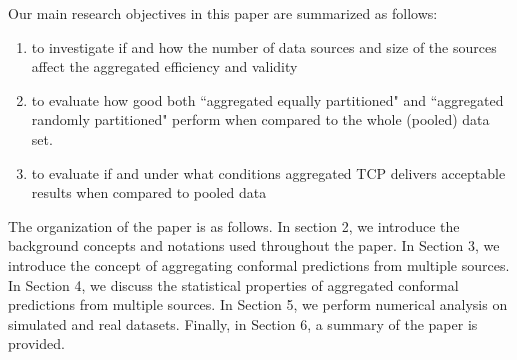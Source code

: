 \documentclass[main]{subfiles}
\newcommand{\todo}[1]{{\color{blue} #1 }}
\begin{document}

Our main research objectives in this paper are summarized as follows:

\begin{enumerate}
\item to investigate if and how the number of data sources and size of the sources affect the aggregated efficiency and validity

\item to evaluate how good both ``aggregated equally partitioned" and ``aggregated randomly partitioned" perform when compared to the whole (pooled) data set.

\item to evaluate if and under what conditions aggregated TCP delivers acceptable results when compared to pooled data



\end{enumerate}

The organization of the paper is as follows. In section 2, we introduce the background concepts and notations used throughout the paper. In Section 3, we introduce the concept of aggregating conformal predictions from multiple sources. In Section 4, we discuss the statistical properties of aggregated conformal predictions from multiple sources. In Section 5, we perform numerical analysis on simulated and real datasets. Finally, in Section 6, a summary of the paper is provided.
\end{document}

